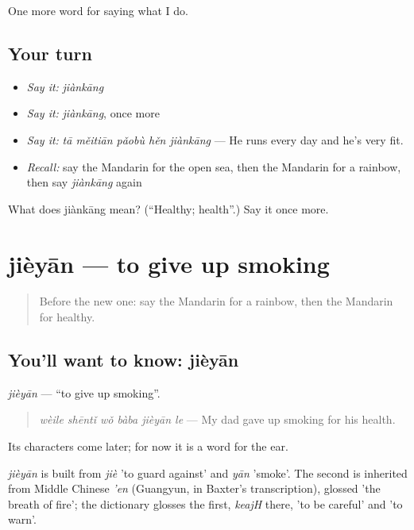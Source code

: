 \begin{grammarlens}[title={What you've built}]
One more word for saying what I do.
\end{grammarlens}

\subsection*{Your turn}
\begin{itemize}
\raggedright
  \item \emph{Say it:} \emph{jiànkāng}
  \item \emph{Say it:} \emph{jiànkāng}, once more
  \item \emph{Say it:} \emph{tā měitiān pǎobù hěn jiànkāng} — He runs every day and he's very fit.
  \item \emph{Recall:} say the Mandarin for the open sea, then the Mandarin for a rainbow, then say \emph{jiànkāng} again
\end{itemize}

\begin{tcolorbox}[breakable,colback=teal!4,colframe=teal!35!black,title={Before you move on}]
What does jiànkāng mean? (\textquotedblleft{}Healthy; health\textquotedblright{}.) Say it once more.
\end{tcolorbox}
\section[jièyān]{jièyān — to give up smoking}

\label{lesson:ZH-C239-jieyan}



\begin{quote}
Before the new one: say the Mandarin for a rainbow, then the Mandarin for healthy.
\end{quote}

\subsection*{You'll want to know: jièyān}
\emph{jièyān} — \textquotedblleft{}to give up smoking\textquotedblright{}.

\begin{quote}
\emph{wèile shēntǐ wǒ bàba jièyān le} — My dad gave up smoking for his health.
\end{quote}

Its characters come later; for now it is a word for the ear.

\begin{cousinweb}
\emph{jièyān} is built from \emph{jiè} 'to guard against' and \emph{yān} 'smoke'. The second is inherited from Middle Chinese \emph{'en} (Guangyun, in Baxter's transcription), glossed 'the breath of fire'; the dictionary glosses the first, \emph{keajH} there, 'to be careful' and 'to warn'.
\end{cousinweb}

